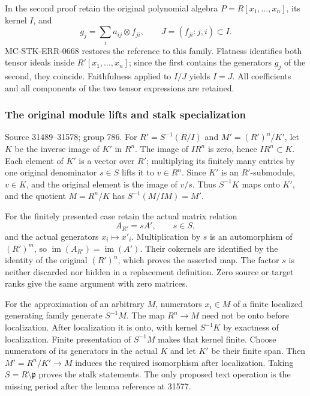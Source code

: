 In the second proof retain the original polynomial algebra \(P=R[x_1,\ldots,x_n]\), its kernel \(I\), and \[
g_j=\sum_i a_{ij}\otimes f_{ji},\qquad
J=(f_{ji}:j,i)\subset I.
\] MC-STK-ERR-0668 restores the reference to this family. Flatness identifies both tensor ideals inside \(R'[x_1,\ldots,x_n]\); since the first contains the generators \(g_j\) of the second, they coincide. Faithfulness applied to \(I/J\) yields \(I=J\). All coefficients and all components of the two tensor expressions are retained.

\subsubsection{The original module lifts and stalk specialization}\label{algebra-proof-035-the-original-module-lifts-and-stalk-specialization}

Source 31489--31578; group 786. For \(R'=S^{-1}(R/I)\) and \(M'=(R')^n/K'\), let \(K\) be the inverse image of \(K'\) in \(R^n\). The image of \(I R^n\) is zero, hence \(IR^n\subset K\). Each element of \(K'\) is a vector over \(R'\); multiplying its finitely many entries by one original denominator \(s\in S\) lifts it to \(v\in R^n\). Since \(K'\) is an \(R'\)-submodule, \(v\in K\), and the original element is the image of \(v/s\). Thus \(S^{-1}K\) maps onto \(K'\), and the quotient \(M=R^n/K\) has \(S^{-1}(M/IM)=M'\).

For the finitely presented case retain the actual matrix relation \[
A_{R'}=sA',\qquad s\in S,
\] and the actual generators \(x_i\mapsto x'_i\). Multiplication by \(s\) is an automorphism of \((R')^m\), so \(\operatorname{im}(A_{R'})=\operatorname{im}(A')\). Their cokernels are identified by the identity of the original \((R')^n\), which proves the asserted map. The factor \(s\) is neither discarded nor hidden in a replacement definition. Zero source or target ranks give the same argument with zero matrices.

For the approximation of an arbitrary \(M\), numerators \(x_i\in M\) of a finite localized generating family generate \(S^{-1}M\). The map \(R^n\to M\) need not be onto before localization. After localization it is onto, with kernel \(S^{-1}K\) by exactness of localization. Finite presentation of \(S^{-1}M\) makes that kernel finite. Choose numerators of its generators in the actual \(K\) and let \(K'\) be their finite span. Then \(M'=R^n/K'\to M\) induces the required isomorphism after localization. Taking \(S=R\setminus\mathfrak p\) proves the stalk statements. The only proposed text operation is the missing period after the lemma reference at 31577.

